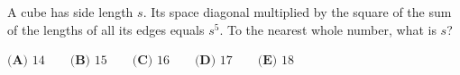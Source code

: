 A cube has side length $s$. Its space diagonal multiplied by the square of the sum of the lengths of all its edges equals $s^5$. To the nearest whole number, what is $s$?

$\textbf{(A) } 14 \qquad \textbf{(B) } 15 \qquad \textbf{(C) } 16 \qquad \textbf{(D) } 17 \qquad \textbf{(E) } 18$
